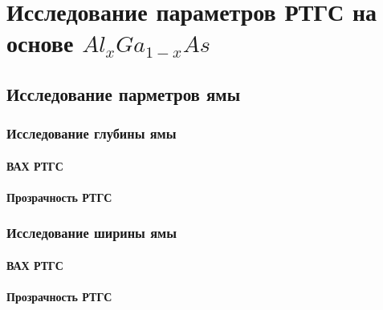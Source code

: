 \chapter{Исследование параметров РТГС на основе $Al_{x}Ga_{1-x}As$}
\section{Исследование парметров ямы}

\subsection{Исследование глубины ямы}
\subsubsection{ВАХ РТГС}
\subsubsection{Прозрачность РТГС}

\subsection{Исследование ширины ямы}
\subsubsection{ВАХ РТГС}
\subsubsection{Прозрачность РТГС}


